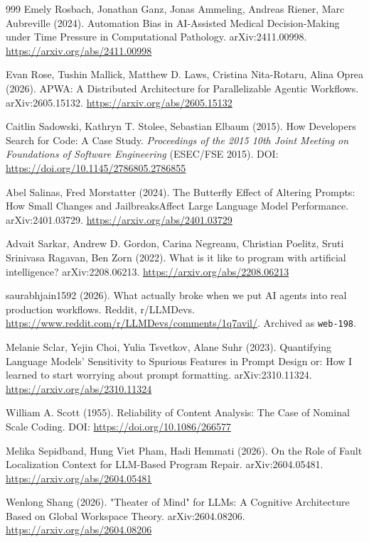 \begin{thebibliography}{999}
 Emely Rosbach, Jonathan Ganz, Jonas Ammeling, Andreas Riener, Marc Aubreville (2024). Automation Bias in AI-Assisted Medical Decision-Making under Time Pressure in Computational Pathology. arXiv:2411.00998. \url{https://arxiv.org/abs/2411.00998}

 Evan Rose, Tushin Mallick, Matthew D. Laws, Cristina Nita-Rotaru, Alina Oprea (2026). APWA: A Distributed Architecture for Parallelizable Agentic Workflows. arXiv:2605.15132. \url{https://arxiv.org/abs/2605.15132}

 Caitlin Sadowski, Kathryn T. Stolee, Sebastian Elbaum (2015). How Developers Search for Code: A Case Study. \emph{Proceedings of the 2015 10th Joint Meeting on Foundations of Software Engineering} (ESEC/FSE 2015). DOI: \url{https://doi.org/10.1145/2786805.2786855}

 Abel Salinas, Fred Morstatter (2024). The Butterfly Effect of Altering Prompts: How Small Changes and JailbreaksAffect Large Language Model Performance. arXiv:2401.03729. \url{https://arxiv.org/abs/2401.03729}

 Advait Sarkar, Andrew D. Gordon, Carina Negreanu, Christian Poelitz, Sruti Srinivasa Ragavan, Ben Zorn (2022). What is it like to program with artificial intelligence? arXiv:2208.06213. \url{https://arxiv.org/abs/2208.06213}

 saurabhjain1592 (2026). What actually broke when we put AI agents into real production workflows. Reddit, r/LLMDevs. \url{https://www.reddit.com/r/LLMDevs/comments/1q7avil/}. Archived as \texttt{web-198}.

 Melanie Sclar, Yejin Choi, Yulia Tsvetkov, Alane Suhr (2023). Quantifying Language Models' Sensitivity to Spurious Features in Prompt Design or: How I learned to start worrying about prompt formatting. arXiv:2310.11324. \url{https://arxiv.org/abs/2310.11324}

 William A. Scott (1955). Reliability of Content Analysis: The Case of Nominal Scale Coding. DOI: \url{https://doi.org/10.1086/266577}

 Melika Sepidband, Hung Viet Pham, Hadi Hemmati (2026). On the Role of Fault Localization Context for LLM-Based Program Repair. arXiv:2604.05481. \url{https://arxiv.org/abs/2604.05481}

 Wenlong Shang (2026). "Theater of Mind" for LLMs: A Cognitive Architecture Based on Global Workspace Theory. arXiv:2604.08206. \url{https://arxiv.org/abs/2604.08206}


\end{thebibliography}
